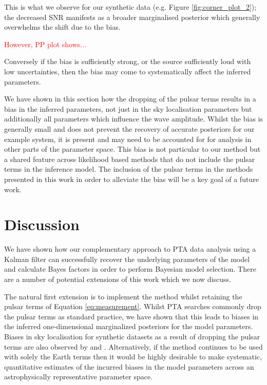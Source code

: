\documentclass[fleqn,usenatbib,useAMS]{mnras}
\begin{document}
This is what we observe for our synthetic data (e.g. Figure \ref{fig:corner_plot_2}); the decreased SNR manifests as a broader marginalised posterior which generally overwhelms the shift due to the bias.  

\textcolor{red}{However, PP plot shows...}


Conversely if the bias is sufficiently strong, or the source sufficiently loud with low uncertainties, then the bias may come to systematically affect the inferred parameters. \newline  

We have shown in this section how the dropping of the pulsar terms results in a bias in the inferred parameters, not just in the sky localisation parameters  \citep[e.g.][]{Zhupulsarterms,Chen2022} but additionally all parameters which influence the wave amplitude. Whilst the bias is generally small and does not prevent the recovery of accurate posteriors for our example system, it is present and may need to be accounted for for analysis in other parts of the parameter space. This bias is not particular to our method but a shared feature across likelihood based methods that do not include the pulsar terms in the inference model. The inclusion of the pulsar terms in the methods presented in this work in order to alleviate the bias will be a key goal of a future work. 










\section{Discussion}
We have shown how our complementary approach to PTA data analysis using a Kalman filter can successfully recover the underlying parameters of the model and calculate Bayes factors in order to perform Bayesian model selection. There are a number of potential extensions of this work which we now discuss.  \newline 

The natural first extension is to implement the method whilst retaining the pulsar terms of Equation \ref{eq:measurement}. Whilst PTA searches commonly drop the pulsar terms as standard practice, we have shown that this leads to biases in the inferred one-dimensional marginalized posteriors for the model parameters. Biases in sky localisation for synthetic datasets as a result of dropping the pulsar terms are also observed by \cite{Zhupulsarterms} and \cite{Chen2022}. Alternatively, if the method continues to be used with solely the Earth terms then it would be highly desirable to make systematic, quantitative estimates of the incurred biases in the model parameters across an astrophysically representative parameter space. \newline 
\end{document}
